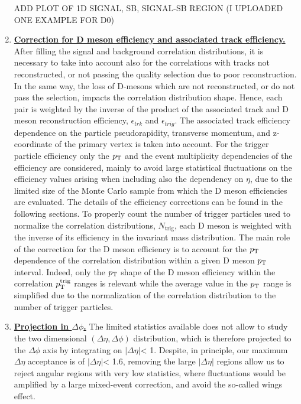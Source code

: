 \begin{enumerate}
\begin{figure}[h]
\end{figure}

ADD PLOT OF 1D SIGNAL, SB, SIGNAL-SB REGION (I UPLOADED ONE EXAMPLE FOR D0)

\item
\underline{\bf Correction for D meson efficiency and associated track efficiency.}
After filling the signal and background correlation distributions, it is necessary to take into account also for the correlations with tracks not reconstructed, or not passing the quality selection due to poor reconstruction. In the same way, the loss of D-mesons which are not reconstructed, or do not pass the selection, impacts the correlation distribution shape. Hence, each pair is weighted by the
inverse of the product of the associated track and D meson reconstruction efficiency, $\epsilon_{trk}$ and $\epsilon_{trig}$.
The associated track efficiency dependence on the particle
pseudorapidity, transverse momentum, and z-coordinate of the primary vertex is taken into account. For the trigger particle
efficiency only the $p_{\rm T}$ and the event multiplicity dependencies of the efficiency are considered, mainly to avoid large statistical fluctuations
on the efficiency values arising when including also the dependency on $\eta$, due to the limited
size of the Monte Carlo sample from which the D meson efficiencies are evaluated. %
The details of the efficiency corrections can be found in the following sections. To properly count
the number of trigger particles used to normalize the correlation distributions, $N_\text{trig}$, each D meson is weighted with the inverse of its efficiency
in the invariant mass distribution. The main role of the correction for the D meson efficiency
is to account for the $p_{\rm T}$ dependence of the correlation distribution within a given
D meson $p_{\rm T}$ interval. Indeed, only the $p_{\rm T}$ shape of the D meson efficiency within the correlation $p_{\rm T}^{\rm trig}$ ranges is relevant while the average value
in the $p_{\rm T}$ range is simplified due to the normalization of the correlation distribution to the number of
trigger particles.

\item
\underline {\bf Projection in $\Delta\phi$.}
The limited statistics available does not allow to study the two dimensional
$(\Delta\eta,\Delta\phi)$ distribution, which is therefore projected to the $\Delta\phi$ axis by integrating on $|\Delta\eta|$< 1. Despite, in principle, our maximum $\Delta\eta$ acceptance is of $|\Delta\eta|$< 1.6, removing the large $|\Delta\eta|$ regions allow us to reject angular regions with very low statistics, where fluctuations would be amplified by a large mixed-event correction, and avoid the so-called wings effect.


\end{enumerate}
